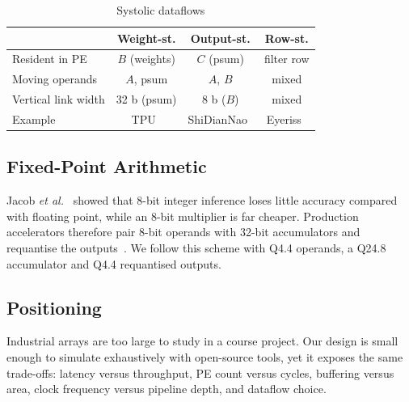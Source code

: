 \begin{table}[t]
\centering
\caption{Systolic dataflows}
\label{tab:dataflow}
\setlength{\tabcolsep}{3pt}
\begin{tabular}{@{}lccc@{}}
\toprule
 & \textbf{Weight-st.} & \textbf{Output-st.} & \textbf{Row-st.}\\
\midrule
Resident in PE & $B$ (weights) & $C$ (psum) & filter row \\
Moving operands & $A$, psum & $A$, $B$ & mixed \\
Vertical link width & 32 b (psum) & 8 b ($B$) & mixed \\
Example & TPU~\cite{jouppi2017tpu} & ShiDianNao~\cite{du2015shidiannao} & Eyeriss~\cite{chen2017eyeriss}\\
\bottomrule
\end{tabular}
\end{table}

\subsection{Fixed-Point Arithmetic}
Jacob \emph{et al.}~\cite{jacob2018quantization} showed that 8-bit integer
inference loses little accuracy compared with floating point, while an
8-bit multiplier is far cheaper. Production accelerators therefore pair
8-bit operands with 32-bit accumulators and requantise the
outputs~\cite{jouppi2017tpu}. We follow this scheme with Q4.4 operands, a
Q24.8 accumulator and Q4.4 requantised outputs.

\subsection{Positioning}
Industrial arrays are too large to study in a course project. Our design
is small enough to simulate exhaustively with open-source tools, yet it
exposes the same trade-offs: latency versus throughput, PE count versus
cycles, buffering versus area, clock frequency versus pipeline depth, and
dataflow choice.
